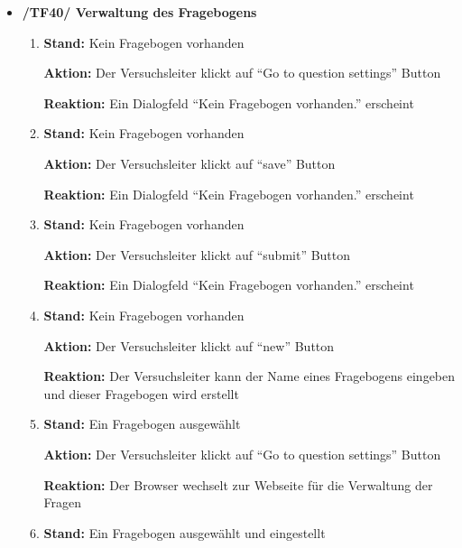 \documentclass[a4paper]{scrreprt}
\begin{document}
\begin{itemize}
                \item \textbf{/TF40/ Verwaltung des Fragebogens}
                    \begin{enumerate}
                        \item \par \textbf{Stand: }Kein Fragebogen vorhanden
                              \par \textbf{Aktion: }Der \gls{Versuchsleiter} klickt auf ``Go to question settings'' Button
                              \par \textbf{Reaktion: }Ein Dialogfeld ``Kein Fragebogen vorhanden.'' erscheint
                        \item \par \textbf{Stand: } Kein Fragebogen vorhanden
                              \par \textbf{Aktion: }Der \gls{Versuchsleiter} klickt auf ``save'' Button
                              \par \textbf{Reaktion: }Ein Dialogfeld ``Kein Fragebogen vorhanden.'' erscheint
                        \item \par \textbf{Stand: }Kein Fragebogen vorhanden
                              \par \textbf{Aktion: }Der \gls{Versuchsleiter} klickt auf ``submit'' Button
                              \par \textbf{Reaktion: }Ein Dialogfeld ``Kein Fragebogen vorhanden.'' erscheint
                        \item \par \textbf{Stand: }Kein Fragebogen vorhanden
                              \par \textbf{Aktion: }Der \gls{Versuchsleiter} klickt auf ``new'' Button
                              \par \textbf{Reaktion: }Der \gls{Versuchsleiter} kann der Name eines Fragebogens eingeben und dieser Fragebogen wird erstellt
                        \item \par \textbf{Stand: }Ein Fragebogen ausgewählt
                              \par \textbf{Aktion: }Der \gls{Versuchsleiter} klickt auf ``Go to question settings'' Button
                              \par \textbf{Reaktion: }Der Browser wechselt zur Webseite für die Verwaltung der Fragen
                        \item \par \textbf{Stand: }Ein Fragebogen ausgewählt und eingestellt

\end{enumerate}
\end{itemize}
\end{document}
